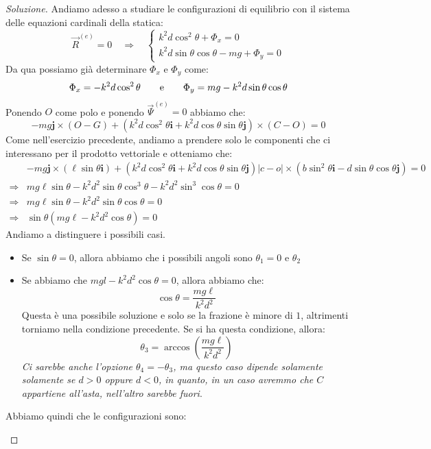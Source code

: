 \documentclass[11pt,a4paper,twoside]{article}
\theoremstyle{definition}
\newenvironment{sol}
	{\renewcommand\qedsymbol{$\blacksquare$}\begin{proof}[Soluzione]}
	{\end{proof}}
\begin{document}
\begin{sol}
	Andiamo adesso a studiare le configurazioni di equilibrio con il sistema delle equazioni cardinali della statica:
	\[ \vec R^{(e)}=0 \quad \Rightarrow \quad
		\begin{cases}
			k^2d\cos^2\theta + \Phi_x = 0\\
			k^2 d \sin \theta \cos \theta - mg + \Phi_y = 0
	\end{cases}\]
	Da qua possiamo già determinare $\Phi_x$ e $\Phi_y$ come:
	\[ \Phi_x = -k^2 d \cos^2 \theta \qquad \text e \qquad \Phi_y = mg-k^2d \sin\theta \cos \theta \]
	Ponendo $O$ come polo e ponendo $\vec \Psi^{(e)}= 0$ abbiamo che:
	\[ -mg\mathbf j \times (O-G) + (k^2d \cos^2 \theta \mathbf i + k^2 d \cos \theta \sin \theta \mathbf j) \times (C-O) = 0 \]
	Come nell'esercizio precedente, andiamo a prendere solo le componenti che ci interessano per il prodotto vettoriale e otteniamo che:
	\begin{align*}
		& -mg\mathbf j \times (\ell \sin \theta \mathbf i) + (k^2 d \cos^2\theta \mathbf i + k^2 d\cos \theta \sin \theta \mathbf j)|c-o| \times (b \sin^2 \theta \mathbf i- d \sin\theta \cos \theta \mathbf j)=0\\
		\Rightarrow & mg\ell \sin \theta - k^2d^2 \sin \theta \cos^3 \theta - k^2 d^2 \sin^3 \cos \theta = 0\\
		\Rightarrow & mg\ell \sin \theta - k^2d^2 \sin \theta \cos \theta = 0\\
		\Rightarrow & \sin \theta (mg\ell - k^2d^2 \cos \theta) = 0
	\end{align*}
	Andiamo a distinguere i possibili casi.
	\begin{itemize}
		\item Se $\sin \theta = 0$, allora abbiamo che i possibili angoli sono $\theta_1 = 0$ e $\theta_2$
		\item Se abbiamo che $mgl-k^2d^2\cos \theta = 0$, allora abbiamo che:
			\[ \cos \theta = \frac {mg\ell}{k^2 d^2} \]
			Questa è una possibile soluzione e solo se la frazione è minore di $1$, altrimenti torniamo nella condizione precedente. Se si ha questa condizione, allora:
			\[ \theta_3 = \arccos\left(\frac{mg\ell}{k^2d^2}\right) \]
			\textit{Ci sarebbe anche l'opzione $\theta_4 = -\theta_3$, ma questo caso dipende solamente solamente se $d>0$ oppure $d<0$, in quanto, in un caso avremmo che $C$ appartiene all'asta, nell'altro sarebbe fuori}.
	\end{itemize}
	Abbiamo quindi che le configurazioni sono:
	\begin{center}
		\begin{tikzpicture}

\end{tikzpicture}
\end{center}
\end{sol}
\end{document}
